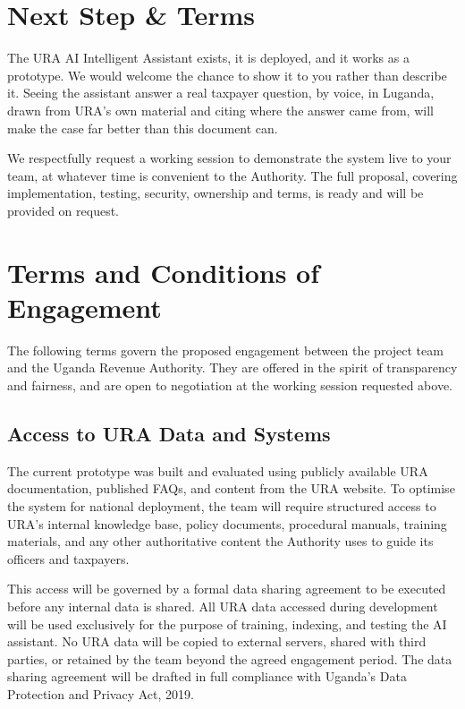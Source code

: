 \documentclass[11pt,a4paper]{article}
\begin{document}
\section{Next Step \& Terms}

The URA AI Intelligent Assistant exists, it is deployed, and it works as a prototype. We would welcome the chance to show it to you rather than describe it. Seeing the assistant answer a real taxpayer question, by voice, in Luganda, drawn from URA's own material and citing where the answer came from, will make the case far better than this document can.

We respectfully request a working session to demonstrate the system live to your team, at whatever time is convenient to the Authority. The full proposal, covering implementation, testing, security, ownership and terms, is ready and will be provided on request.

\section{Terms and Conditions of Engagement}

The following terms govern the proposed engagement between the project team and the Uganda Revenue Authority. They are offered in the spirit of transparency and fairness, and are open to negotiation at the working session requested above.

\subsection{Access to URA Data and Systems}

The current prototype was built and evaluated using publicly available URA documentation, published FAQs, and content from the URA website. To optimise the system for national deployment, the team will require structured access to URA's internal knowledge base, policy documents, procedural manuals, training materials, and any other authoritative content the Authority uses to guide its officers and taxpayers.

This access will be governed by a formal data sharing agreement to be executed before any internal data is shared. All URA data accessed during development will be used exclusively for the purpose of training, indexing, and testing the AI assistant. No URA data will be copied to external servers, shared with third parties, or retained by the team beyond the agreed engagement period. The data sharing agreement will be drafted in full compliance with Uganda's Data Protection and Privacy Act, 2019.
\end{document}
